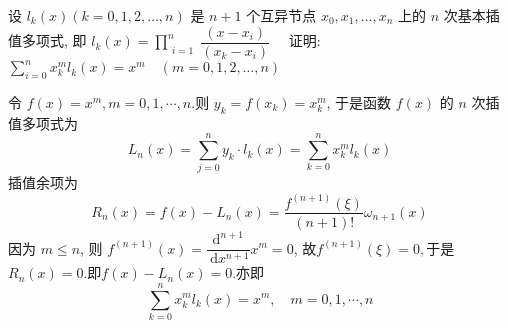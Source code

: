 \begin{tcolorbox}[breakable,
		colframe=white!10!jingga, coltitle=white!90!jingga, colback=white!95!jingga, coltext=black, colbacktitle=white!10!jingga, enhanced, fonttitle=\bfseries,fontupper=\normalsize, attach boxed title to top left={yshift=-2mm}, before skip=8pt, after skip=8pt,
		title=解答题]

设 $ l_{k}(x)(k=0,1,2, \ldots, n) $ 是 $ n+1 $ 个互异节点 $ x_{0}, x_{1}, \ldots, x_{n} $ 上的 $ n $ 次基本插值多项式, 即 $ l_{k}(x)=\prod\limits_{\substack{i=1}}^{n} \dfrac{\left(x-x_{i}\right)}{\left(x_{k}-x_{i}\right)} \quad $ 证明: $ \sum\limits_{i=0}^{n} x_{k}^{m} l_{k}(x)=x^{m} \quad(m=0,1,2, \ldots, n) $

\tcblower
令 $ f(x)=x^{m}, m=0,1, \cdots, n $.则 $ y_{k}=f\left(x_{k}\right)=x_k^m$,  于是函数 $ f(x) $ 的 $ n $ 次插值多项式为
$$
L_{n}(x)=\sum_{j=0}^{n}  y_k \cdot l_{k}(x)=\sum_{k=0}^{n} x_{k}^{m} l_{k}(x)
$$
插值余项为
$$
R_{n}(x)=f(x)-L_{n}(x)=\frac{f^{(n+1)}(\xi)}{(n+1) !}  \omega_{n+1}(x)
$$
因为 $ m \leqslant n $, 则 $ f^{(n+1)}(x)=\dfrac{\mathrm{d}^{n+1}}{\mathrm{~d} x^{n+1}} x^{m}=0 $,
故$f^{(n+1)}(\xi)=0,$于是$R_{n}(x)=0 .$即$f(x)-L_{n}(x)=0$.亦即
$$
\sum_{k=0}^{n} x_{k}^{m} l_{k}(x)=x^{m}, \quad m=0,1, \cdots, n
$$
\end{tcolorbox}